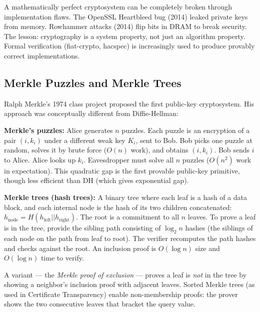 A mathematically perfect cryptosystem can be completely broken through implementation flaws. The OpenSSL Heartbleed bug (2014) leaked private keys from memory. Rowhammer attacks (2014) flip bits in DRAM to break security. The lesson: cryptography is a system property, not just an algorithm property. Formal verification (fiat-crypto, hacspec) is increasingly used to produce provably correct implementations.

\subsection{Merkle Puzzles and Merkle Trees}
\label{sec:crypto:merkle}

Ralph Merkle's 1974 class project proposed the first public-key cryptosystem. His approach was conceptually different from Diffie-Hellman:

\textbf{Merkle's puzzles:} Alice generates $n$ puzzles. Each puzzle is an encryption of a pair $(i, k_i)$ under a different weak key $K_i$, sent to Bob. Bob picks one puzzle at random, solves it by brute force ($O(n)$ work), and obtains $(i, k_i)$. Bob sends $i$ to Alice. Alice looks up $k_i$. Eavesdropper must solve all $n$ puzzles ($O(n^2)$ work in expectation). This quadratic gap is the first provable public-key primitive, though less efficient than DH (which gives exponential gap).

\textbf{Merkle trees (hash trees):} A binary tree where each leaf is a hash of a data block, and each internal node is the hash of its two children concatenated: $h_{\text{node}} = H(h_{\text{left}} || h_{\text{right}})$. The root is a commitment to all $n$ leaves. To prove a leaf is in the tree, provide the sibling path consisting of $\log_2 n$ hashes (the siblings of each node on the path from leaf to root). The verifier recomputes the path hashes and checks against the root. An inclusion proof is $O(\log n)$ size and $O(\log n)$ time to verify.

A variant — the \emph{Merkle proof of exclusion} — proves a leaf is \emph{not} in the tree by showing a neighbor's inclusion proof with adjacent leaves. Sorted Merkle trees (as used in Certificate Transparency) enable non-membership proofs: the prover shows the two consecutive leaves that bracket the query value.

